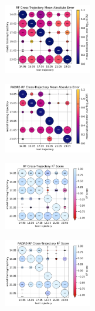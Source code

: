 \begin{figure}[H]
    \centering
    \begin{subfigure}
        \centering
        \includegraphics[width=0.425\textwidth]{evaluation/figures/results/trajectory-generalisation-rf-mae.pdf}
    \end{subfigure}
    \begin{subfigure}
        \centering
        \includegraphics[width=0.425\textwidth]{evaluation/figures/results/trajectory-generalisation-padre-rf-mae.pdf}
    \end{subfigure}

    \begin{subfigure}
        \centering
        \includegraphics[width=0.425\textwidth]{evaluation/figures/results/trajectory-generalisation-rf-r2.pdf}
    \end{subfigure}
    \begin{subfigure}
        \centering
        \includegraphics[width=0.425\textwidth]{evaluation/figures/results/trajectory-generalisation-padre-rf-r2.pdf}
    \end{subfigure}


\end{figure}
